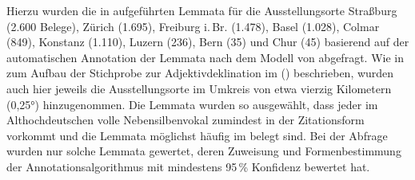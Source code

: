 Hierzu wurden die in  aufgeführten Lemmata für die
Ausstellungsorte
Straßburg (2.600 Belege),
% 
Zürich (1.695),
% 
Freiburg i.\,Br. (1.478),
% 
Basel (1.028),
% 
Colmar (849),
% 
Konstanz (1.110),
% 
Luzern (236),
% 
Bern (35)
% 
und Chur (45)
% 
basierend auf der automatischen Annotation der Lemmata nach dem
Modell von \citet{schmid2019} abgefragt. Wie in
 zum Aufbau der Stichprobe zur Adjektivdeklination
im  (\CAO) beschrieben, wurden
auch hier jeweils die Ausstellungsorte im Umkreis von etwa vierzig Kilometern
(0,25°) hinzugenommen. Die Lemmata wurden so ausgewählt, dass jeder im
Althochdeutschen volle Nebensilbenvokal zumindest in der
Zitationsform vorkommt und die Lemmata möglichst häufig im \CAO{} belegt sind.
Bei der Abfrage wurden nur solche Lemmata gewertet, deren Zuweisung und
Formenbestimmung der Annotations\-algorithmus mit mindestens 95\,\% Konfidenz
bewertet hat.

